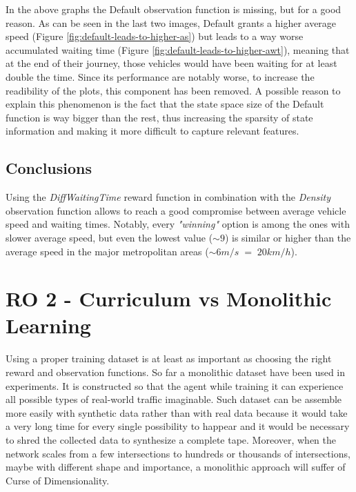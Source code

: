 In the above graphs the Default observation function is missing, but for a good reason.
As can be seen in the last two images, Default grants a higher average speed (Figure \ref{fig:default-leads-to-higher-as}) but leads to a way worse accumulated waiting time (Figure \ref{fig:default-leads-to-higher-awt}), meaning that at the end of their journey, those vehicles would have been waiting for at least double the time.
Since its performance are notably worse, to increase the readibility of the plots, this component has been removed.
A possible reason to explain this phenomenon is the fact that the state space size of the Default function is way bigger than the rest, thus increasing the sparsity of state information and making it more difficult to capture relevant features.


\subsection{Conclusions}

Using the \textit{DiffWaitingTime} reward function in combination with the \textit{Density} observation function allows to reach a good compromise between average vehicle speed and waiting times.
Notably, every \textit{"winning"} option is among the ones with slower average speed, but even the lowest value ($\sim9$) is similar or higher than the average speed in the major metropolitan areas ($\sim 6 m/s \; = \; 20 km/h$).

\section{RO 2 - Curriculum vs Monolithic Learning}

Using a proper training dataset is at least as important as choosing the right reward and observation functions.
So far a monolithic dataset have been used in experiments.
It is constructed so that the agent while training it can experience all possible types of real-world traffic imaginable.
Such dataset can be assemble more easily with synthetic data rather than with real data because it would take a very long time for every single possibility to happear and it would be necessary to shred the collected data to synthesize a complete tape.
Moreover, when the network scales from a few intersections to hundreds or thousands of intersections, maybe with different shape and importance, a monolithic approach will suffer of Curse of Dimensionality.

